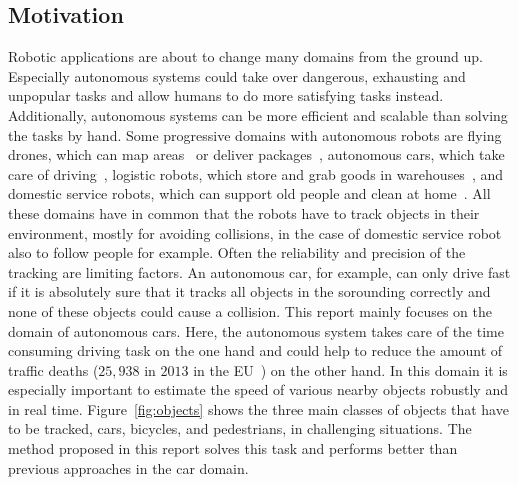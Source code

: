 \documentclass[twoside,a4paper,article]{combine}
\begin{document}
\subsection{Motivation}
\label{sub:motivation}
Robotic applications are about to change many domains from the ground
up. Especially autonomous systems could take over dangerous,
exhausting and unpopular tasks and allow humans to do more satisfying
tasks instead. Additionally, autonomous systems can be more efficient
and scalable than solving the tasks by hand. Some progressive domains
with autonomous robots are flying drones, which can map
areas~\cite{auto-drones} or deliver
packages~\cite{auto-delivery-drones}, autonomous cars, which take care
of driving~\cite{auto-cars}, logistic robots, which store and grab
goods in warehouses~\cite{kiva}, and domestic service robots, which
can support old people and clean at home~\cite{athome}. All these
domains have in common that the robots have to track objects in their
environment, mostly for avoiding collisions, in the case of domestic
service robot also to follow people for example. Often the reliability
and precision of the tracking are limiting factors. An autonomous car,
for example, can only drive fast if it is absolutely sure that it
tracks all objects in the sorounding correctly and none of these
objects could cause a collision.  This report mainly focuses on the
domain of autonomous cars. Here, the autonomous system takes care of
the time consuming driving task on the one hand and could help to
reduce the amount of traffic deaths ($25,938$ in $2013$ in the
EU~\cite{traffic-deaths}) on the other hand. In this domain it is
especially important to estimate the speed of various nearby objects
robustly and in real time. Figure~\ref{fig:objects} shows the three
main classes of objects that have to be tracked, cars, bicycles, and
pedestrians, in challenging situations. The method proposed in this
report solves this task and performs better than previous approaches
in the car domain.
\end{document}
